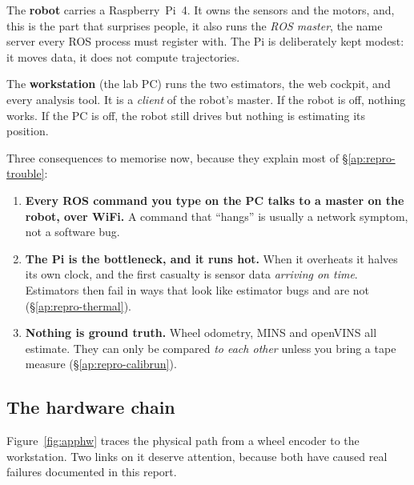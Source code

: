 The \textbf{robot} carries a Raspberry~Pi~4. It owns the sensors and the
motors, and, this is the part that surprises people, it also runs the
\emph{ROS master}, the name server every ROS process must register with. The
Pi is deliberately kept modest: it moves data, it does not compute
trajectories.

The \textbf{workstation} (the lab PC) runs the two estimators, the web
cockpit, and every analysis tool. It is a \emph{client} of the robot's master.
If the robot is off, nothing works. If the PC is off, the robot still drives
but nothing is estimating its position.

Three consequences to memorise now, because they explain most of
\S\ref{ap:repro-trouble}:

\begin{enumerate}[leftmargin=1.4em]
\item \textbf{Every ROS command you type on the PC talks to a master on the
  robot, over WiFi.} A command that ``hangs'' is usually a network symptom,
  not a software bug.
\item \textbf{The Pi is the bottleneck, and it runs hot.} When it overheats it
  halves its own clock, and the first casualty is sensor data
  \emph{arriving on time}. Estimators then fail in ways that look like
  estimator bugs and are not (\S\ref{ap:repro-thermal}).
\item \textbf{Nothing is ground truth.} Wheel odometry, MINS and openVINS all
  estimate. They can only be compared \emph{to each other} unless you bring a
  tape measure (\S\ref{ap:repro-calibrun}).
\end{enumerate}

\subsection{The hardware chain}
\label{ap:repro-hw}
Figure~\ref{fig:apphw} traces the physical path from a wheel encoder to the
workstation. Two links on it deserve attention, because both have caused real
failures documented in this report.

